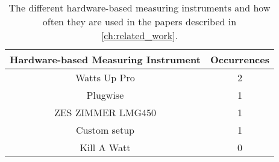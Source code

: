 \begin{table}[ht]
    \centering
    \begin{tabular}{|| c | c ||}
    \hline
    \textbf{Hardware-based Measuring Instrument}  & \textbf{Occurrences}                    \\ [0.5ex] \hline\hline
    Watts Up Pro        & 2      \\ 
    Plugwise            & 1      \\ 
    ZES ZIMMER LMG450   & 1      \\ 
    Custom setup        & 1      \\ 
    Kill A Watt         & 0      \\ \hline
    \end{tabular}
    \caption{The different hardware-based measuring instruments and how often they are used in the papers described in \cref{ch:related_work}.}
    \label{tab:Hardware_based_Measuring_instruments}
    \end{table}